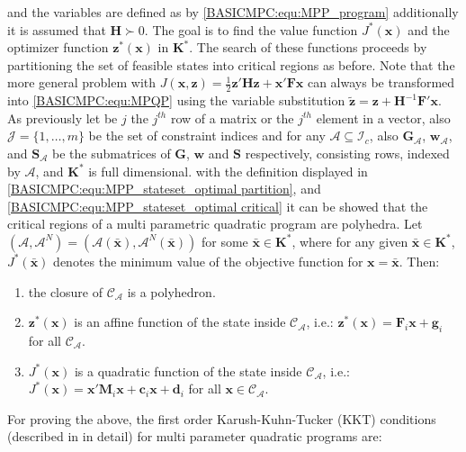     and the variables are defined as by \ref{BASICMPC:equ:MPP_program} additionally it is assumed that $\textbf{H}\succ 0$. The goal is to find the value function $J^*(\textbf{x})$ and the optimizer function $\textbf{z}^*(\textbf{x})$ in $\textbf{K}^*$. The search of these functions proceeds by partitioning the set of feasible states into critical regions as before. Note that the more general problem with $J(\textbf{x},\textbf{z})=\frac{1}{2}\textbf{z}'\textbf{H}\textbf{z}+\textbf{x}'\textbf{F}\textbf{x}$ can always be transformed into \ref{BASICMPC:equ:MPQP} using the variable substitution $\tilde{\textbf{z}}=\textbf{z}+\textbf{H}^{-1}\textbf{F}'\textbf{x}$.\\
    As previously let be $j$ the $j^{th}$ row of a matrix or the $j^{th}$ element in a vector, also $\mathcal{J}=\{1,\dots,m\}$ be the set of constraint indices and for any $\mathcal{A}\subseteq\mathcal{I}_c$, also $\textbf{G}_{\mathcal{A}}$, $\textbf{w}_{\mathcal{A}}$, and $\textbf{S}_{\mathcal{A}}$ be the submatrices of $\textbf{G}$, $\textbf{w}$ and $\textbf{S}$ respectively, consisting rows, indexed by $\mathcal{A}$, and $\textbf{K}^*$ is full dimensional.
    with the definition displayed in \ref{BASICMPC:equ:MPP_stateset_optimal partition}, and \ref{BASICMPC:equ:MPP_stateset_optimal critical} it can be showed that the critical regions of a multi parametric quadratic program are polyhedra. Let $(\mathcal{A},\mathcal{A}^N)=(\mathcal{A}(\bar{\textbf{x}}),\mathcal{A}^N(\bar{\textbf{x}}))$ for some $\bar{\textbf{x}}\in\textbf{K}^*$, where for any given $\bar{\textbf{x}}\in\textbf{K}^*$, $J^*(\bar{\textbf{x}})$ denotes the minimum value of the objective function for $\textbf{x}=\bar{\textbf{x}}$. Then:

    \begin{enumerate}
    \item the closure of $\mathcal{C}_{\mathcal{A}}$ is a polyhedron.
    \item $\textbf{z}^*(\textbf{x})$ is an affine function of the state inside $\mathcal{C}_{\mathcal{A}}$, i.e.: $\textbf{z}^*(\textbf{x})=\textbf{F}_i\textbf{x}+\textbf{g}_i$ for all $\mathcal{C}_{\mathcal{A}}$.
    \item $J^*(\textbf{x})$ is a quadratic function of the state inside $\mathcal{C}_{\mathcal{A}}$, i.e.: $J^*(\textbf{x})=\textbf{x}'\textbf{M}_i\textbf{x}+\textbf{c}_i\textbf{x}+\textbf{d}_i$ for all $\textbf{x}\in\mathcal{C}_{\mathcal{A}}$.
    \end{enumerate}

    For proving the above, the first order Karush-Kuhn-Tucker (KKT) conditions (described in \cite{borrelli2017predictive} in detail) for multi parameter quadratic programs are:

